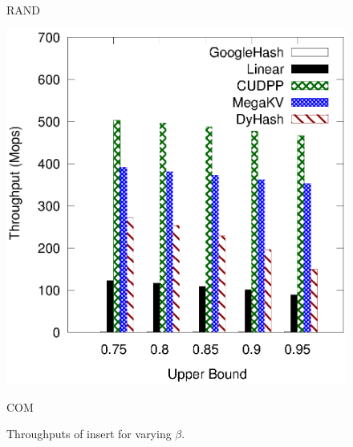 \begin{figure}[h]
\begin{minipage}{0.19\linewidth}
	\centerline{RAND}
	\end{minipage}
	\hfill
	\begin{minipage}{0.19\linewidth}\centering
	\includegraphics[width=\linewidth]{pic/static-upper/upper_insert_ali.eps}
	\centerline{COM}
	\end{minipage}
	\caption{Throughputs of insert for varying $\beta$.}
	\label{fig:static}
\end{figure}
